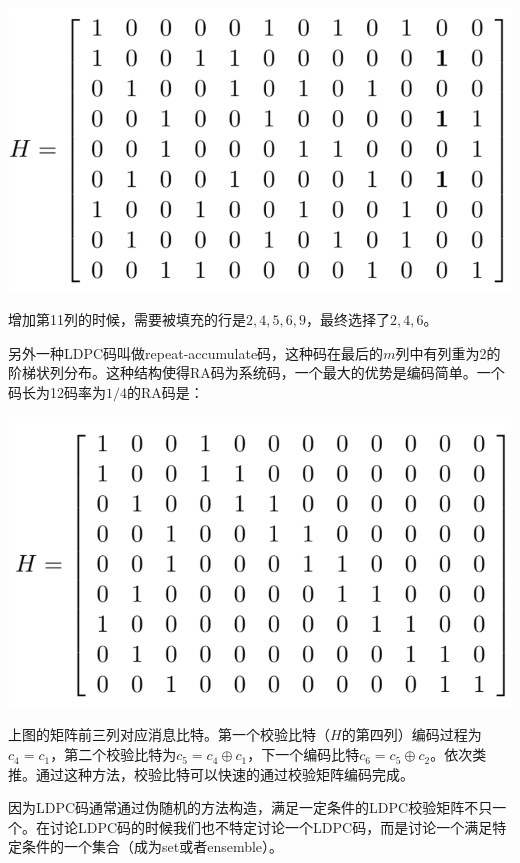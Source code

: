 \documentclass[10pt,a4paper,UTF8]{article}
\begin{document}
\begin{center}
\includegraphics[width=.9\linewidth]{../../img/communication_coding/20171018MackayNeal.png}
\end{center}

增加第11列的时候，需要被填充的行是\(2,4,5,6,9\)，最终选择了\(2,4,6\)。

另外一种LDPC码叫做repeat-accumulate码，这种码在最后的\(m\)列中有列重为2的阶梯状列分布。这种结构使得RA码为系统码，一个最大的优势是编码简单。一个码长为12码率为\(1/4\)的RA码是：

\begin{center}
\includegraphics[width=.9\linewidth]{../../img/communication_coding/20171018RA.png}
\end{center}

上图的矩阵前三列对应消息比特。第一个校验比特（\(H\)的第四列）编码过程为\(c_{4}=c_{1}\)，第二个校验比特为\(c_{5}=c_{4}\oplus c_{1}\)，下一个编码比特\(c_{6}=c_{5}\oplus c_{2}\)。依次类推。通过这种方法，校验比特可以快速的通过校验矩阵编码完成。

因为LDPC码通常通过伪随机的方法构造，满足一定条件的LDPC校验矩阵不只一个。在讨论LDPC码的时候我们也不特定讨论一个LDPC码，而是讨论一个满足特定条件的一个集合（成为set或者ensemble）。
\end{document}
